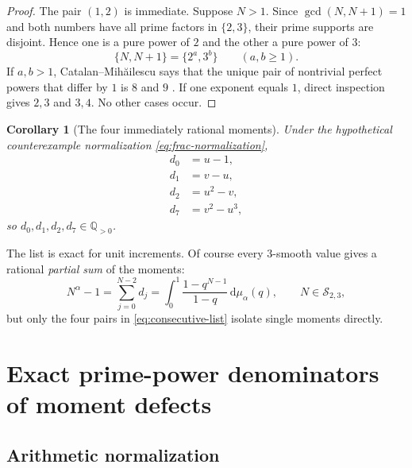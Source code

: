 \documentclass[11pt,oneside]{article}
\newtheorem{corollary}[theorem]{Corollary}
\theoremstyle{definition}
\theoremstyle{remark}
\newcommand{\Q}{\mathbb Q}
\newcommand{\Ssmooth}{\mathcal S_{2,3}}
\newcommand{\dd}{\,\mathrm d}
\begin{document}
\begin{proof}
The pair $(1,2)$ is immediate.  Suppose $N>1$.  Since $\gcd(N,N+1)=1$ and both numbers have
all prime factors in $\{2,3\}$, their prime supports are disjoint.  Hence one is a pure power
of $2$ and the other a pure power of $3$:
\[
 \{N,N+1\}=\{2^a,3^b\}
 \qquad(a,b\ge1).
\]
If $a,b>1$, Catalan--Mih\u{a}ilescu says that the unique pair of nontrivial perfect powers that
differ by $1$ is $8$ and $9$ \cite{Mihailescu2004}.  If one exponent equals $1$, direct
inspection gives $2,3$ and $3,4$.  No other cases occur.
\end{proof}

\begin{corollary}[The four immediately rational moments]\label{cor:four-moments}
Under the hypothetical counterexample normalization \eqref{eq:frac-normalization},
\begin{equation}\label{eq:four-moments}
 \begin{aligned}
 d_0&=u-1,\\
 d_1&=v-u,\\
 d_2&=u^2-v,\\
 d_7&=v^2-u^3,
 \end{aligned}
\end{equation}
so $d_0,d_1,d_2,d_7\in\Q_{>0}$.
\end{corollary}

The list is exact for unit increments.  Of course every $3$-smooth value gives a rational
\emph{partial sum} of the moments:
\begin{equation}\label{eq:partial-sums}
 N^\alpha-1
 =\sum_{j=0}^{N-2}d_j
 =\int_0^1\frac{1-q^{N-1}}{1-q}\dd\mu_\alpha(q),
 \qquad N\in\Ssmooth,
\end{equation}
but only the four pairs in \eqref{eq:consecutive-list} isolate single moments directly.

\section{Exact prime-power denominators of moment defects}

\subsection{Arithmetic normalization}
\end{document}
